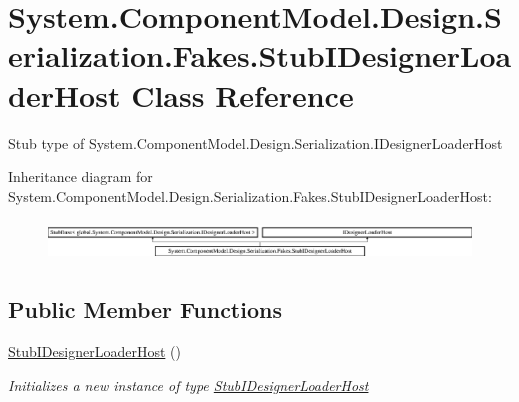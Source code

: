\hypertarget{class_system_1_1_component_model_1_1_design_1_1_serialization_1_1_fakes_1_1_stub_i_designer_loader_host}{\section{System.\-Component\-Model.\-Design.\-Serialization.\-Fakes.\-Stub\-I\-Designer\-Loader\-Host Class Reference}
\label{class_system_1_1_component_model_1_1_design_1_1_serialization_1_1_fakes_1_1_stub_i_designer_loader_host}
}


Stub type of System.\-Component\-Model.\-Design.\-Serialization.\-I\-Designer\-Loader\-Host 


Inheritance diagram for System.\-Component\-Model.\-Design.\-Serialization.\-Fakes.\-Stub\-I\-Designer\-Loader\-Host\-:\begin{figure}[H]
\begin{center}
\leavevmode
\includegraphics[height=1.085271cm]{class_system_1_1_component_model_1_1_design_1_1_serialization_1_1_fakes_1_1_stub_i_designer_loader_host}
\end{center}
\end{figure}
\subsection*{Public Member Functions}
\begin{DoxyCompactItemize}
\item 
\hyperlink{class_system_1_1_component_model_1_1_design_1_1_serialization_1_1_fakes_1_1_stub_i_designer_loader_host_a8638a35e35c909c6318d9b3197729c94}{Stub\-I\-Designer\-Loader\-Host} ()
\begin{DoxyCompactList}\small\item\em Initializes a new instance of type \hyperlink{class_system_1_1_component_model_1_1_design_1_1_serialization_1_1_fakes_1_1_stub_i_designer_loader_host}{Stub\-I\-Designer\-Loader\-Host}\end{DoxyCompactList}\end{DoxyCompactItemize}
